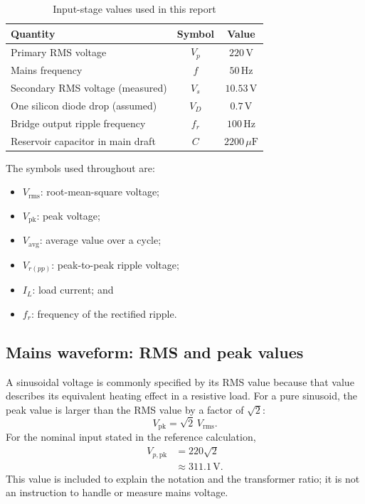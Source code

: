 \documentclass[journal,12pt,twocolumn]{IEEEtran}
\begin{document}
\begin{table}[!t]
\centering
\caption{Input-stage values used in this report}
\label{tab:input-values}
\small
\begin{tabular}{|p{}|c|c|}
\hline
\textbf{Quantity} & \textbf{Symbol} & \textbf{Value}\\ \hline
Primary RMS voltage & $V_p$ & $220\,\mathrm{V}$\\ \hline
Mains frequency & $f$ & $50\,\mathrm{Hz}$\\ \hline
Secondary RMS voltage (measured) & $V_s$ & $10.53\,\mathrm{V}$\\ \hline
One silicon diode drop (assumed) & $V_D$ & $0.7\,\mathrm{V}$\\ \hline
Bridge output ripple frequency & $f_r$ & $100\,\mathrm{Hz}$\\ \hline
Reservoir capacitor in main draft & $C$ & $2200\,\mu\mathrm{F}$\\ \hline
\end{tabular}
\end{table}

The symbols used throughout are:
\begin{itemize}[leftmargin=1.5em]
    \item $V_{\mathrm{rms}}$: root-mean-square voltage;
    \item $V_{\mathrm{pk}}$: peak voltage;
    \item $V_{\mathrm{avg}}$: average value over a cycle;
    \item $V_{r(pp)}$: peak-to-peak ripple voltage;
    \item $I_L$: load current; and
    \item $f_r$: frequency of the rectified ripple.
\end{itemize}

\subsection*{Mains waveform: RMS and peak values}
A sinusoidal voltage is commonly specified by its RMS value because
that value describes its equivalent heating effect in a resistive
load. For a pure sinusoid, the peak value is larger than the RMS value
by a factor of $\sqrt{2}$:
\begin{equation}
    \boxed{V_{\mathrm{pk}}=\sqrt{2}\,V_{\mathrm{rms}}.}
    \label{eq:rms-peak}
\end{equation}
For the nominal input stated in the reference calculation,
\begin{align}
    V_{p,\mathrm{pk}}
    &=220\sqrt{2}\\
    &\approx 311.1\,\mathrm{V}.
\end{align}
This value is included to explain the notation and the transformer
ratio; it is not an instruction to handle or measure mains voltage.
\end{document}
